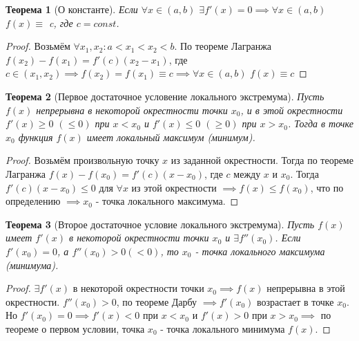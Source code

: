 \documentclass[a4paper,oneside]{article}
\newtheorem{theorem}{Теорема}[subsection]
\theoremstyle{definition}
\theoremstyle{definition}
\theoremstyle{definition}
\begin{document}
\begin{theorem}[О константе]
    Если $\forall x \in (a, b)$  $\exists f'(x) = 0 \implies \forall x \in (a, b)$ $f(x) \equiv$ c, где $c = const$.
\end{theorem}
\begin{proof}
    Возьмём $\forall x_1, x_2: a < x_1 < x_2 < b$. По теореме Лагранжа $f(x_2) - f(x_1) = f'(c)(x_2-x_1)$, где $c \in (x_1, x_2) \implies f(x_2) = f(x_1) \equiv c \implies \forall x \in (a, b)$ $f(x) \equiv c$
\end{proof}

\begin{theorem}[Первое достаточное условение локального экстремума]
    Пусть $f(x)$ непрерывна в некоторой окрестности точки $x_0$, и в этой окрестности $f'(x) \geq 0$ $(\leq 0)$ при $x < x_0$ и $f'(x) \leq 0$ $(\geq 0)$ при $x > x_0$. Тогда в точке $x_0$ функция $f(x)$ имеет локальный максимум (минимум).
\end{theorem}
\begin{proof}
    Возьмём произвольную точку $x$ из заданной окрестности. Тогда по теореме Лагранжа $f(x)-f(x_0) = f'(c)(x - x_0)$, где $c$ между $x$ и $x_0$. Тогда $f'(c)(x - x_0) \leq 0$ для $\forall x$ из этой окрестности $\implies f(x) \leq f(x_0)$, что по определению $\implies x_0$ - точка локального максимума.
\end{proof}

\begin{theorem}[Второе достаточное условие локального экстремума]
    Пусть $f(x)$ имеет $f'(x)$ в некоторой окрестности точки $x_0$ и $\exists f''(x_0)$. Если $f'(x_0) = 0$, а $f''(x_0) > 0 (< 0)$, то $x_0$ - точка локального максимума (минимума).
\end{theorem}
\begin{proof}
    $\exists f'(x)$ в некоторой окрестности точки $x_0 \implies f(x)$ непрерывна в этой окрестности. $f''(x_0) > 0$, по теореме Дарбу $\implies f'(x_0)$ возрастает в точке $x_0$. Но $f'(x_0) = 0 \implies f'(x) < 0$ при $x < x_0$ и $f'(x) > 0$ при $x > x_0 \implies$ по теореме о первом условии, точка $x_0$ - точка локального минимума $f(x)$.
\end{proof}
\end{document}
